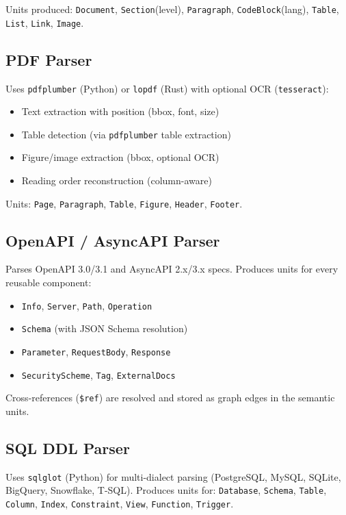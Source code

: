 Units produced: \texttt{Document}, \texttt{Section}(level), \texttt{Paragraph}, \texttt{CodeBlock}(lang), \texttt{Table}, \texttt{List}, \texttt{Link}, \texttt{Image}.

\subsection{PDF Parser}
\label{sec:parsing:pdf}

Uses \texttt{pdfplumber} (Python) or \texttt{lopdf} (Rust) with optional OCR (\texttt{tesseract}):
\begin{itemize}
  \item Text extraction with position (bbox, font, size)
  \item Table detection (via \texttt{pdfplumber} table extraction)
  \item Figure/image extraction (bbox, optional OCR)
  \item Reading order reconstruction (column-aware)
\end{itemize}

Units: \texttt{Page}, \texttt{Paragraph}, \texttt{Table}, \texttt{Figure}, \texttt{Header}, \texttt{Footer}.

\subsection{OpenAPI / AsyncAPI Parser}
\label{sec:parsing:openapi}

Parses OpenAPI 3.0/3.1 and AsyncAPI 2.x/3.x specs. Produces units for every reusable component:
\begin{itemize}
  \item \texttt{Info}, \texttt{Server}, \texttt{Path}, \texttt{Operation}
  \item \texttt{Schema} (with JSON Schema resolution)
  \item \texttt{Parameter}, \texttt{RequestBody}, \texttt{Response}
  \item \texttt{SecurityScheme}, \texttt{Tag}, \texttt{ExternalDocs}
\end{itemize}

Cross-references (\texttt{\$ref}) are resolved and stored as graph edges in the semantic units.

\subsection{SQL DDL Parser}
\label{sec:parsing:sql-parser}

Uses \texttt{sqlglot} (Python) for multi-dialect parsing (PostgreSQL, MySQL, SQLite, BigQuery, Snowflake, T-SQL).
Produces units for: \texttt{Database}, \texttt{Schema}, \texttt{Table}, \texttt{Column}, \texttt{Index}, \texttt{Constraint}, \texttt{View}, \texttt{Function}, \texttt{Trigger}.

